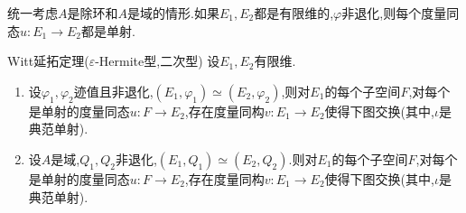\begin{remark}{}{}
	统一考虑$A$是除环和$A$是域的情形.如果$E_{1},E_{2}$都是有限维的,$\varphi$非退化,则每个度量同态$u:E_{1}\to E_{2}$都是单射.
\end{remark}

\begin{theorem}{Witt延拓定理($\varepsilon$-Hermite型,二次型)}{}
	设$E_{1},E_{2}$有限维.
	\begin{enumerate}
		\item 设$\varphi_{1},\varphi_{2}$迹值且非退化,$\left(E_{1},\varphi_{1}\right)\simeq\left(E_{2},\varphi_{2}\right)$,则对$E_{1}$的每个子空间$F$,对每个是单射的度量同态$u:F\to E_{2}$,存在度量同构$v:E_{1}\to E_{2}$使得下图交换(其中,$\iota$是典范单射).
		\begin{center}
		\end{center}
		\item 设$A$是域,$Q_{1},Q_{2}$非退化,$\left(E_{1},Q_{1}\right)\simeq\left(E_{2},Q_{2}\right)$.则对$E_{1}$的每个子空间$F$,对每个是单射的度量同态$u:F\to E_{2}$,存在度量同构$v:E_{1}\to E_{2}$使得下图交换(其中,$\iota$是典范单射).
		\begin{center}
		\end{center}
	\end{enumerate}
\end{theorem}

